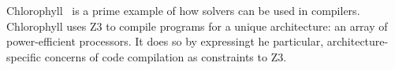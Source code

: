 

Chlorophyll~\cite{phothilimthana2014chlorophyll}
  is a prime example
  of how solvers can be used
  in compilers.
Chlorophyll
  uses Z3
  to compile programs
  for a unique
  architecture:
  an array of power-efficient
  processors.
It does so by
  expressingt he particular,
  architecture-specific concerns
  of code compilation
  as constraints
  to Z3.
